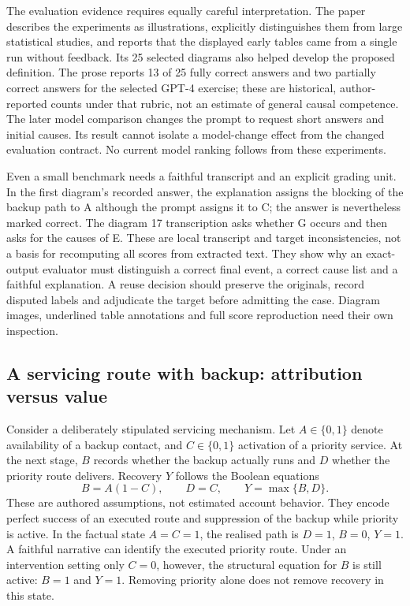 The evaluation evidence requires equally careful interpretation. The paper
describes the experiments as illustrations, explicitly distinguishes them
from large statistical studies, and reports that the displayed early tables
came from a single run without feedback. Its 25 selected diagrams also
helped develop the proposed definition. The prose reports 13 of 25 fully
correct answers and two partially correct answers for the selected GPT-4
exercise; these are historical, author-reported counts under that rubric,
not an estimate of general causal competence. The later model comparison
changes the prompt to request short answers and initial causes. Its result
cannot isolate a model-change effect from the changed evaluation contract.
No current model ranking follows from these experiments.\citep{exec18_reasoning_neuron}

Even a small benchmark needs a faithful transcript and an explicit grading
unit. In the first diagram's recorded answer, the explanation assigns the
blocking of the backup path to A although the prompt assigns it to C; the
answer is nevertheless marked correct. The diagram 17 transcription asks
whether G occurs and then asks for the causes of E. These are local
transcript and target inconsistencies, not a basis for recomputing all scores
from extracted text. They show why an exact-output evaluator must distinguish
a correct final event, a correct cause list and a faithful explanation. A
reuse decision should preserve the originals, record disputed labels and
adjudicate the target before admitting the case. Diagram images, underlined
table annotations and full score reproduction need their own inspection.\citep{exec18_reasoning_neuron}

\subsection{A servicing route with backup: attribution versus value}
\label{exec18:reasoning-example}
Consider a deliberately stipulated servicing mechanism. Let $A\in\{0,1\}$
denote availability of a backup contact, and $C\in\{0,1\}$ activation of a
priority service. At the next stage, $B$ records whether the backup actually
runs and $D$ whether the priority route delivers. Recovery $Y$ follows the
Boolean equations
\begin{equation}
 B=A(1-C),\qquad D=C,\qquad Y=\max\{B,D\}.
 \label{exec18:reasoning-mechanism}
\end{equation}
These are authored assumptions, not estimated account behavior. They encode
perfect success of an executed route and suppression of the backup while
priority is active. In the factual state $A=C=1$, the realised path is
$D=1$, $B=0$, $Y=1$. A faithful narrative can identify the executed priority
route. Under an intervention setting only $C=0$, however, the structural
equation for $B$ is still active: $B=1$ and $Y=1$. Removing priority alone
does not remove recovery in this state.\citep{exec18_reasoning_reference}

